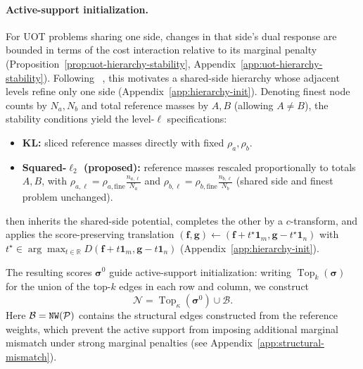 \paragraph{Active-support initialization.}
For UOT problems sharing one side, changes in that side's dual response are bounded in terms of the cost interaction relative to its marginal penalty (Proposition~\ref{prop:uot-hierarchy-stability}, Appendix~\ref{app:uot-hierarchy-stability}).
Following \hello~\citep{xia2026dual}, this motivates a shared-side hierarchy whose adjacent levels refine only one side (Appendix~\ref{app:hierarchy-init}).
Denoting finest node counts by $N_a,N_b$ and total reference masses by $A,B$ (allowing $A\ne B$), the stability conditions yield the level-$\ell$ specifications:
\begin{itemize}
\item \textbf{KL:} sliced reference masses directly with fixed $\rho_a,\rho_b$.
\item \textbf{Squared-$\ell_2$ (proposed):} reference masses rescaled proportionally to totals $A,B$, with $\rho_{a,\ell}=\rho_{a,\mathrm{fine}}\frac{n_{a,\ell}}{N_a}$ and $\rho_{b,\ell}=\rho_{b,\mathrm{fine}}\frac{n_{b,\ell}}{N_b}$ (shared side and finest problem unchanged).
\end{itemize}
\init then inherits the shared-side potential, completes the other by a $c$-transform, and applies the score-preserving translation $(\mathbf{f},\mathbf{g})\leftarrow(\mathbf{f}+t^\star\mathbf{1}_m,\mathbf{g}-t^\star\mathbf{1}_n)$ with $t^\star\in\arg\max_{t\in\mathbb R} D(\mathbf{f}+t\mathbf{1}_m,\mathbf{g}-t\mathbf{1}_n)$ (Appendix~\ref{app:hierarchy-init}).

The resulting scores $\boldsymbol\sigma^0$ guide active-support initialization: writing $\operatorname{Top}_k(\boldsymbol\sigma)$ for the union of the top-$k$ edges in each row and column, we construct
\begin{equation*}
\mathcal N=\operatorname{Top}_{\kappa}(\boldsymbol\sigma^0)\cup\mathcal B.
\end{equation*}
Here $\mathcal B=\texttt{NW}(\mathcal P)$ contains the structural edges constructed from the reference weights, which prevent the active support from imposing additional marginal mismatch under strong marginal penalties (see Appendix~\ref{app:structural-mismatch}).



